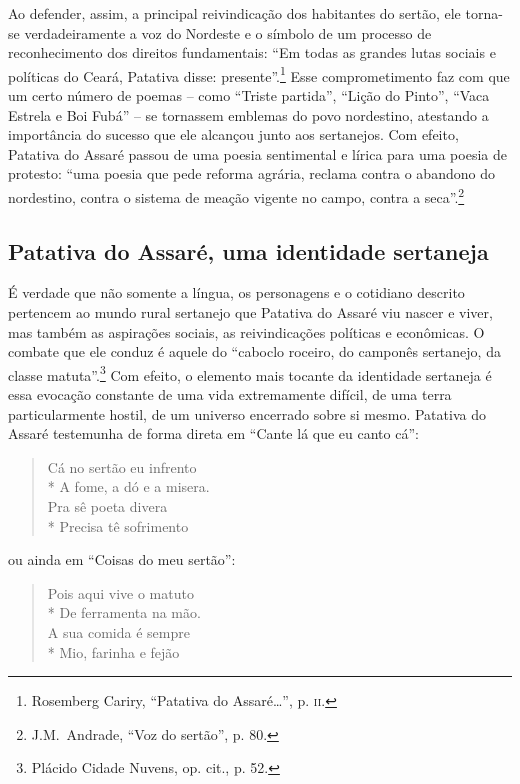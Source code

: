 Ao defender, assim, a principal reivindicação dos habitantes do sertão, ele
torna-se verdadeiramente a voz do Nordeste e o símbolo de um processo de
reconhecimento dos direitos fundamentais: “Em todas as grandes lutas sociais e
políticas do Ceará, Patativa disse: presente”.\footnote{ Rosemberg Cariry,
“Patativa do Assaré\ldots{}”, p. \textsc{ii}.} Esse comprometimento faz com que um certo
número de poemas -- como “Triste partida”, “Lição do Pinto”, “Vaca Estrela e Boi
Fubá” -- se tornassem emblemas do povo nordestino, atestando a importância do
sucesso que ele alcançou junto aos sertanejos. Com efeito, Patativa do Assaré
passou de uma poesia sentimental e lírica para uma poesia de protesto: “uma
poesia que pede reforma agrária, reclama contra o abandono do nordestino, contra
o sistema de meação vigente no campo, contra a seca”.\footnote{ J.M.~Andrade,
“Voz do sertão”, p. 80.}

\subsection{Patativa do Assaré, uma identidade sertaneja}

É verdade que não somente a língua, os personagens e o cotidiano descrito
pertencem ao mundo rural sertanejo que Patativa do Assaré viu nascer e viver,
mas também as aspirações sociais, as reivindicações políticas e econômicas. O
combate que ele conduz é aquele do “caboclo roceiro, do camponês sertanejo, da
classe matuta”.\footnote{ Plácido Cidade Nuvens, op. cit., p. 52.} Com
efeito, o elemento mais tocante da identidade sertaneja é essa evocação
constante de uma vida extremamente difícil, de uma terra particularmente hostil,
de um universo encerrado sobre si mesmo. Patativa do Assaré testemunha de forma
direta em “Cante lá que eu canto cá”: 

\begin{verse}
Cá no sertão eu infrento\\*
A fome, a dó e a misera.\\
Pra sê poeta divera\\*
Precisa tê sofrimento 
\end{verse}

\noindent ou ainda em “Coisas do meu sertão”:

\begin{verse}
Pois aqui vive o matuto\\*
De ferramenta na mão.\\
A sua comida é sempre\\*
Mio, farinha e fejão
\end{verse}

